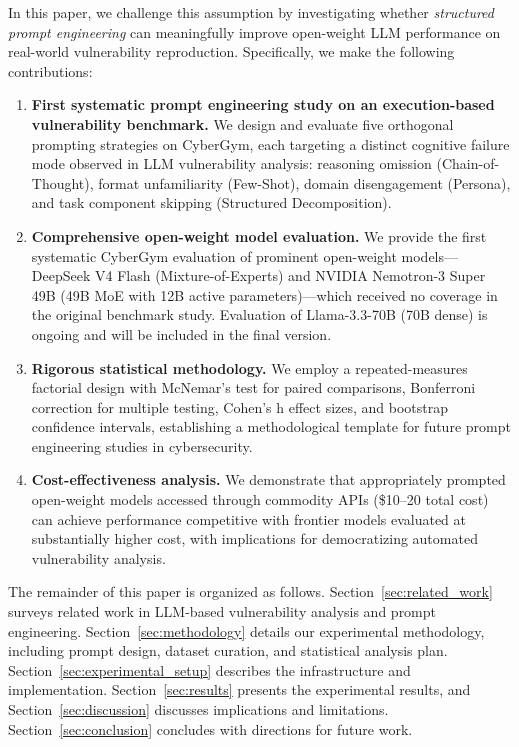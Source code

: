 \documentclass{ieeeaccess}
\begin{document}
In this paper, we challenge this assumption by investigating whether \emph{structured prompt engineering} can meaningfully improve open-weight LLM performance on real-world vulnerability reproduction. Specifically, we make the following contributions:

\begin{enumerate}
    \item \textbf{First systematic prompt engineering study on an execution-based vulnerability benchmark.} We design and evaluate five orthogonal prompting strategies on CyberGym, each targeting a distinct cognitive failure mode observed in LLM vulnerability analysis: reasoning omission (Chain-of-Thought), format unfamiliarity (Few-Shot), domain disengagement (Persona), and task component skipping (Structured Decomposition).
    
    \item \textbf{Comprehensive open-weight model evaluation.} We provide the first systematic CyberGym evaluation of prominent open-weight models---DeepSeek V4 Flash (Mixture-of-Experts) and NVIDIA Nemotron-3 Super 49B (49B MoE with 12B active parameters)---which received no coverage in the original benchmark study. Evaluation of Llama-3.3-70B (70B dense) is ongoing and will be included in the final version.
    
    \item \textbf{Rigorous statistical methodology.} We employ a repeated-measures factorial design with McNemar's test for paired comparisons, Bonferroni correction for multiple testing, Cohen's h effect sizes, and bootstrap confidence intervals, establishing a methodological template for future prompt engineering studies in cybersecurity.
    
    \item \textbf{Cost-effectiveness analysis.} We demonstrate that appropriately prompted open-weight models accessed through commodity APIs (\$10--20 total cost) can achieve performance competitive with frontier models evaluated at substantially higher cost, with implications for democratizing automated vulnerability analysis.
\end{enumerate}

The remainder of this paper is organized as follows. Section~\ref{sec:related_work} surveys related work in LLM-based vulnerability analysis and prompt engineering. Section~\ref{sec:methodology} details our experimental methodology, including prompt design, dataset curation, and statistical analysis plan. Section~\ref{sec:experimental_setup} describes the infrastructure and implementation. Section~\ref{sec:results} presents the experimental results, and Section~\ref{sec:discussion} discusses implications and limitations. Section~\ref{sec:conclusion} concludes with directions for future work.
\end{document}
